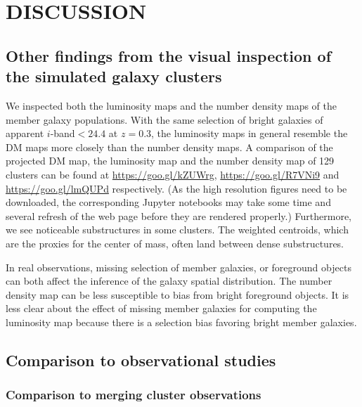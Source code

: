  
 
\section{DISCUSSION}\label{sec:discussion}

\subsection{Other findings from the visual inspection of the simulated galaxy clusters}
We inspected both the luminosity maps and the
number density maps of the member galaxy populations.
With the same selection of bright galaxies of apparent $i$-band$ < 24.4$ at
$z=0.3$, the luminosity maps in general resemble the DM maps more closely than 
the number density maps.
A comparison of the projected 
DM map, the luminosity map and the number density map of 129 clusters 
can be found at \href{https://goo.gl/kZUWrg}{https://goo.gl/kZUWrg}, 
\href{https://goo.gl/R7VNi9}{https://goo.gl/R7VNi9} and
\href{https://goo.gl/lmQUPd}{https://goo.gl/lmQUPd} respectively. (As
 the high resolution figures need to be downloaded, the 
corresponding Jupyter notebooks may take some time and several refresh of the
web page before they are rendered properly.)
Furthermore, we see noticeable substructures in some clusters. The weighted centroids, 
which are the proxies for the center of mass, often land between dense substructures.

In real observations, missing selection of member galaxies, or 
foreground objects can both affect the inference of the galaxy spatial 
distribution. The number density map can be less susceptible to bias from bright 
foreground objects. It is less clear about the effect of missing member galaxies 
for computing the luminosity map because there is a selection bias favoring 
bright member galaxies.

\subsection{Comparison to observational studies}

\subsubsection{Comparison to merging cluster observations}

